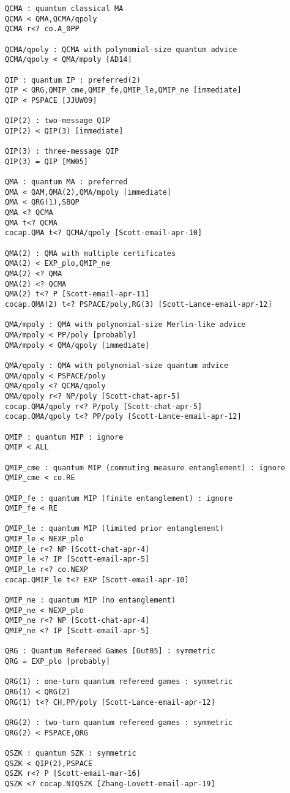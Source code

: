 \begin{verbatim}
QCMA : quantum classical MA
QCMA < QMA,QCMA/qpoly
QCMA r<? co.A_0PP

QCMA/qpoly : QCMA with polynomial-size quantum advice
QCMA/qpoly < QMA/mpoly [AD14]

QIP : quantum IP : preferred(2)
QIP < QRG,QMIP_cme,QMIP_fe,QMIP_le,QMIP_ne [immediate]
QIP < PSPACE [JJUW09]

QIP(2) : two-message QIP
QIP(2) < QIP(3) [immediate]

QIP(3) : three-message QIP
QIP(3) = QIP [MW05]

QMA : quantum MA : preferred
QMA < QAM,QMA(2),QMA/mpoly [immediate]
QMA < QRG(1),SBQP
QMA <? QCMA
QMA t<? QCMA
cocap.QMA t<? QCMA/qpoly [Scott-email-apr-10]

QMA(2) : QMA with multiple certificates
QMA(2) < EXP_plo,QMIP_ne
QMA(2) <? QMA
QMA(2) <? QCMA
QMA(2) t<? P [Scott-email-apr-11]
cocap.QMA(2) t<? PSPACE/poly,RG(3) [Scott-Lance-email-apr-12]

QMA/mpoly : QMA with polynomial-size Merlin-like advice
QMA/mpoly < PP/poly [probably]
QMA/mpoly < QMA/qpoly [immediate]

QMA/qpoly : QMA with polynomial-size quantum advice
QMA/qpoly < PSPACE/poly
QMA/qpoly <? QCMA/qpoly
QMA/qpoly r<? NP/poly [Scott-chat-apr-5]
cocap.QMA/qpoly r<? P/poly [Scott-chat-apr-5]
cocap.QMA/qpoly t<? PP/poly [Scott-Lance-email-apr-12]

QMIP : quantum MIP : ignore
QMIP < ALL

QMIP_cme : quantum MIP (commuting measure entanglement) : ignore
QMIP_cme < co.RE

QMIP_fe : quantum MIP (finite entanglement) : ignore
QMIP_fe < RE

QMIP_le : quantum MIP (limited prior entanglement)
QMIP_le < NEXP_plo
QMIP_le r<? NP [Scott-chat-apr-4]
QMIP_le <? IP [Scott-email-apr-5]
QMIP_le r<? co.NEXP
cocap.QMIP_le t<? EXP [Scott-email-apr-10]

QMIP_ne : quantum MIP (no entanglement)
QMIP_ne < NEXP_plo
QMIP_ne r<? NP [Scott-chat-apr-4]
QMIP_ne <? IP [Scott-email-apr-5]

QRG : Quantum Refereed Games [Gut05] : symmetric
QRG = EXP_plo [probably]

QRG(1) : one-turn quantum refereed games : symmetric
QRG(1) < QRG(2)
QRG(1) t<? CH,PP/poly [Scott-Lance-email-apr-12]

QRG(2) : two-turn quantum refereed games : symmetric
QRG(2) < PSPACE,QRG

QSZK : quantum SZK : symmetric
QSZK < QIP(2),PSPACE
QSZK r<? P [Scott-email-mar-16]
QSZK <? cocap.NIQSZK [Zhang-Lovett-email-apr-19]


\end{verbatim}
